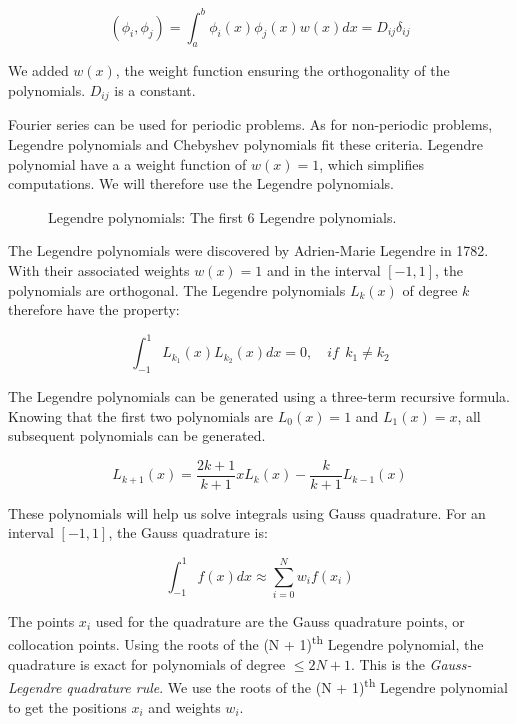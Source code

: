 \begin{equation}
	\left ( \phi_i, \phi_j \right ) = \int_a^b \phi_i(x)\phi_j(x)w(x)dx = D_{ij}\delta_{ij}
\end{equation}

We added $w(x)$, the weight function ensuring the orthogonality of the polynomials. $D_{ij}$ is a
constant. 

Fourier series can be used for periodic problems. As for non-periodic problems, Legendre polynomials
and Chebyshev polynomials fit these criteria. Legendre polynomial have a a weight function of $w(x)
= 1$, which simplifies computations. We will therefore use the Legendre polynomials.

\begin{figure}[H]
	\centering
	
	\caption{Legendre polynomials: The first 6 Legendre polynomials.}
	\label{fig:polynomials}
\end{figure}

The Legendre polynomials were discovered by Adrien-Marie Legendre in 1782. With their associated
weights $w(x) = 1$ and in the interval $\left[ -1, 1 \right]$, the polynomials are orthogonal. The
Legendre polynomials $L_k \left( x \right)$ of degree $k$ therefore have the property:

\begin{equation}
	\int_{-1}^{1}L_{k_1}(x) L_{k_2}(x) dx = 0, \quad if \:\: k_1 \neq k_2
\end{equation}

The Legendre polynomials can be generated using a three-term recursive formula. Knowing that the
first two polynomials are $L_0 \left( x \right) = 1$ and $L_1 \left( x \right) = x$, all subsequent
polynomials can be generated.

\begin{equation} \label{equ:three_terms}
	L_{k + 1}(x) = \frac{2k + 1}{k + 1}xL_k(x) - \frac{k}{k + 1}L_{k - 1}(x)
\end{equation}

These polynomials will help us solve integrals using Gauss quadrature. For an interval $\left[ -1, 1
\right]$, the Gauss quadrature is:

\begin{equation}
	\int_{-1}^{1}f(x)dx \approx \sum_{i = 0}^{N}w_i f(x_i)
\end{equation}

The points $x_i$ used for the quadrature are the Gauss quadrature points, or collocation points.
Using the roots of the (N + 1)\textsuperscript{th} Legendre polynomial, the quadrature is exact for
polynomials of degree $\leq 2 N + 1$. This is the \textit{Gauss-Legendre quadrature rule}. We use
the roots of the (N + 1)\textsuperscript{th} Legendre polynomial to get the positions $x_i$ and
weights $w_i$.

